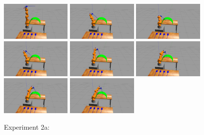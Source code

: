 \begin{center}
\begin{figure}[H]
\centering
\includegraphics[width=0.31\textwidth]{images/robot_planner2/robot_planner2_1}
\includegraphics[width=0.31\textwidth]{images/robot_planner2/robot_planner2_2}
\includegraphics[width=0.31\textwidth]{images/robot_planner2/robot_planner2_3}\\
\includegraphics[width=0.31\textwidth]{images/robot_planner2/robot_planner2_4}
\includegraphics[width=0.31\textwidth]{images/robot_planner2/robot_planner2_5}
\includegraphics[width=0.31\textwidth]{images/robot_planner2/robot_planner2_6}\\
\includegraphics[width=0.31\textwidth]{images/robot_planner2/robot_planner2_7}
\includegraphics[width=0.31\textwidth]{images/robot_planner2/robot_planner2_8}\\
\caption{Experiment 2a:}
\label{experiment-robot-planner2a}
\end{figure}
\end{center}

